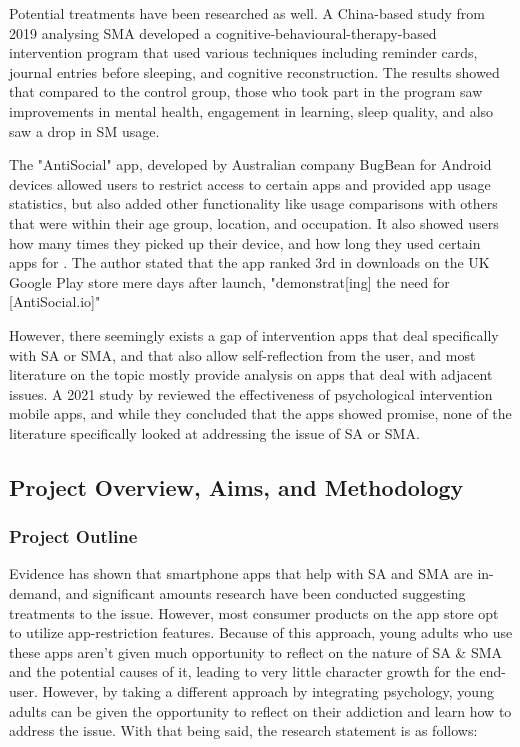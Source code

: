 \documentclass[12pt]{article}
\begin{document}
Potential treatments have been researched as well. A China-based study from 2019 analysing SMA 
 developed a cognitive-behavioural-therapy-based intervention program 
that used various techniques including reminder cards, journal entries before sleeping, and 
cognitive reconstruction. The results showed that compared to the control group, those who took part in the 
program saw improvements in mental health, engagement in learning, sleep quality, and also saw a 
drop in SM usage. \newline

The "AntiSocial" app, developed by Australian company BugBean for Android devices allowed users to restrict access to 
certain apps and provided app usage statistics, but also added other functionality like usage comparisons
with others that were within their age group, location, and occupation. It also showed users how many 
times they picked up their device, and how long they used certain apps for 
. The author stated that the app ranked 3rd in downloads on the 
UK Google Play store mere days after launch, "demonstrat[ing] the need 
for [AntiSocial.io]"\newline

However, there seemingly exists a gap of intervention apps that deal specifically with SA or SMA, and that also 
allow self-reflection from the user, and most literature on the topic mostly provide 
analysis on apps that deal with adjacent issues. A 2021 study by 
reviewed the effectiveness of psychological intervention mobile apps, and while they 
concluded that the apps showed promise, none of 
the literature specifically looked at addressing the issue of SA or SMA.\newline 

\subsection{Project Overview, Aims, and Methodology}

\subsubsection{Project Outline}

Evidence has shown that smartphone apps that help with SA and SMA are 
in-demand, and significant amounts research have been conducted suggesting treatments to the 
issue. However, most consumer products on the app store opt to utilize app-restriction features. Because of 
this approach, young adults who use these apps aren't given much opportunity to reflect on the nature of SA \& SMA 
and the potential causes of it, leading to very little character growth for the end-user. However, by taking a 
different approach by integrating psychology, young adults can be given the opportunity to reflect on their 
addiction and learn how to address the issue. With that being said, the research statement is as follows: \newline
\end{document}
